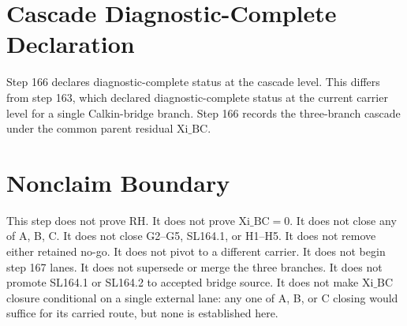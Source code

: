 \documentclass[11pt]{article}
\begin{document}
\section{Cascade Diagnostic-Complete Declaration}

Step 166 declares diagnostic-complete status at the cascade level. This differs from step 163, which declared diagnostic-complete status at the current carrier level for a single Calkin-bridge branch. Step 166 records the three-branch cascade under the common parent residual \(\mathrm{Xi\_BC}\).

\section{Nonclaim Boundary}

This step does not prove RH. It does not prove \(\mathrm{Xi\_BC}=0\). It does not close any of A, B, C. It does not close G2--G5, SL164.1, or H1--H5. It does not remove either retained no-go. It does not pivot to a different carrier. It does not begin step 167 lanes. It does not supersede or merge the three branches. It does not promote SL164.1 or SL164.2 to accepted bridge source. It does not make \(\mathrm{Xi\_BC}\) closure conditional on a single external lane: any one of A, B, or C closing would suffice for its carried route, but none is established here.
\end{document}

